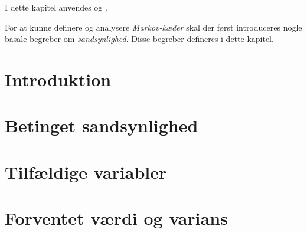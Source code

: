 I dette kapitel anvendes \cite[s. 1-111]{olofsson2005probability} og \cite[s. 24-32]{oxford}. 

For at kunne definere og analysere \textit{Markov-kæder} skal der først introduceres nogle basale begreber om \textit{sandsynlighed}. Disse begreber defineres i dette kapitel. 

\section{Introduktion}


\section{Betinget sandsynlighed}


\section{Tilfældige variabler}


%

\section{Forventet værdi og varians}




